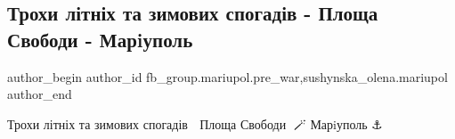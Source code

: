  
 
 
 
 

\subsection{Трохи літніх та зимових спогадів - Площа Свободи - Марiуполь}
\label{sec:12_02_2023.fb.fb_group.mariupol.pre_war.7.trokhi_l_tn_kh_ta_zi}
 
\ifcmt
 author_begin
   author_id fb_group.mariupol.pre_war,sushynska_olena.mariupol
 author_end
\fi

Трохи літніх та зимових спогадів 📸 Площа Свободи 🎨🪄 Марiуполь ⚓
